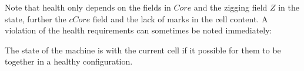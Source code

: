 \documentclass[12pt]{memoir}
\newcommand{\authnote}[3]
{{ \textcolor{#3}{\( \langle\hspace{-0.2em}\langle \)\textsf{\footnotesize #1: #2}\( \rangle\hspace{-0.2em}\rangle \)}}}
\newcommand{\authnote}[2]{}
\newcommand{\Pnote}[1]{{\authnote{Peter}{#1}{cyan}}}
\newcommand{\Inote}[1]{{\authnote{Ilir}{#1}{blue}}}
\newcommand{\fld}[1]{\ensuremath{\textit{#1}}}
\def\B{B}
\newcommand{\Z}{Z}
\newcommand{\Addr}{\fld{Addr}}
\newcommand{\cAddr}{\fld{cAddr}}
\newcommand{\Core}{\fld{Core}}
\newcommand{\cCore}{\fld{cCore}}
\newcommand{\cKind}{\fld{cKind}}
\newcommand{\Sweep}{\fld{Sw}}
\newcommand{\cSweep}{\fld{cSw}}
\begin{document}
Note that health only depends on the fields in \( \Core \) and
the zigging field \( \Z \) in the state, further the  \( \cCore \) field
and the lack of marks in the cell content.
A violation of the health requirements can sometimes be noted immediately:

\begin{definition}[Coordination] \label{def:coordinated}
   The state of the machine is  with the current cell
   if it possible for them to be together in a healthy configuration.
\end{definition}


    

\end{document}
